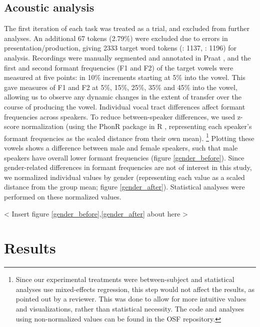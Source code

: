 \documentclass[12 pt]{article}
\newcommand{\nt}[1]{\textipa{[#1]}} %
\begin{document}
\subsection{Acoustic analysis}\label{analysis}
The first iteration of each task was treated as a trial, and excluded from further analyses. An additional 67 tokens (2.79\%) were excluded due to errors in presentation/production, giving 2333 target word tokens (\nt{2}: 1137, \nt{\ae}: 1196) for analysis. Recordings were manually segmented and annotated in Praat \citep{boersma2016praat}, and the first and second formant frequencies (F1 and F2) of the target vowels \nt{2, \ae} were measured at five points: in 10\% increments starting at 5\% into the vowel. This gave measures of F1 and F2 at 5\%, 15\%, 25\%, 35\% and 45\% into the vowel, allowing us to observe any dynamic changes in the extent of transfer over the course of producing the vowel. Individual vocal tract differences affect formant frequencies across speakers. To reduce between-speaker differences, we used z-score normalization (using the PhonR package \citep{phonR} in R \citep{r}, representing each speaker's formant frequencies as the scaled distance from their own mean). \footnote{Since our experimental treatments were between-subject and statistical analyses use mixed-effects regression, this step would not affect the results, as pointed out by a reviewer. This was done to allow for more intuitive values and visualizations, rather than statistical necessity. The code and analyses using non-normalized values can be found in the OSF repository.} Plotting these vowels shows a difference between male and female speakers, such that male speakers have overall lower formant frequencies (figure \ref{gender_before}). %
Since gender-related differences in formant frequencies are not of interest in this study, we normalized individual values by gender (representing each value as a scaled distance from the group mean; figure \ref{gender_after}). Statistical analyses were performed on these normalized values. 

< Insert figure \ref{gender_before},\ref{gender_after} about here >

\section{Results} \label{results}
\end{document}
